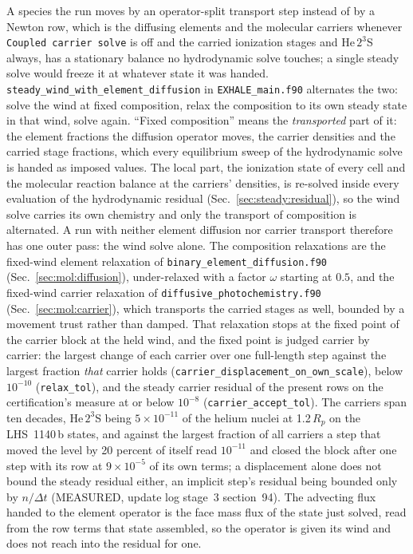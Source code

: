 A species the run moves by an operator-split transport step instead of by a
Newton row, which is the diffusing elements and the molecular carriers
whenever \texttt{Coupled carrier solve} is off and the carried ionization
stages and He\,$2^3$S always, has a stationary balance no
hydrodynamic solve touches; a single steady solve would freeze it at whatever
state it was handed.  \texttt{steady\_wind\_with\_element\_diffusion} in
\texttt{EXHALE\_main.f90} alternates the two: solve the wind at fixed
composition, relax the composition to its own steady state in that wind,
solve again. ``Fixed composition'' means the \emph{transported} part of it:
the element fractions the diffusion operator moves, the carrier densities and
the carried stage fractions, which every equilibrium sweep of the
hydrodynamic solve is handed as imposed values.
The local part, the ionization state of every cell and the molecular
reaction balance at the carriers' densities, is re-solved inside every
evaluation of the hydrodynamic residual (Sec.~\ref{sec:steady:residual}),
so the wind solve carries its own chemistry and only the transport of
composition is alternated. A run with neither element diffusion nor carrier
transport therefore has one outer pass: the wind solve alone.  The composition relaxations are the fixed-wind element
relaxation of \texttt{binary\_element\_diffusion.f90}
(Sec.~\ref{sec:mol:diffusion}), under-relaxed with a factor $\omega$ starting
at $0.5$, and the fixed-wind carrier relaxation of
\texttt{diffusive\_photochemistry.f90} (Sec.~\ref{sec:mol:carrier}), which
transports the carried stages as well, bounded by a movement trust rather than
damped.  That relaxation stops at the fixed point of the carrier block at the
held wind, and the fixed point is judged carrier by carrier: the largest
change of each carrier over one full-length step against the largest
fraction \emph{that} carrier holds (\texttt{carrier\_displacement\_on\_own\_scale}),
below $10^{-10}$ (\texttt{relax\_tol}), and the steady carrier residual of the present rows on the certification's
measure at or below $10^{-8}$ (\texttt{carrier\_accept\_tol}).  The carriers
span ten decades, He\,$2^3$S being $5\times10^{-11}$ of the helium nuclei at
1.2\,$R_p$ on the LHS~1140\,b states, and against the largest fraction of all
carriers a step that moved the level by 20 percent of itself read
$10^{-11}$ and closed the block after one step with its row at
$9\times10^{-5}$ of its own terms; a displacement alone does not bound the
steady residual either, an implicit step's residual being bounded only by
$n/\Delta t$ (MEASURED, update log stage~3 section~94).  The advecting flux handed to the element operator is the face
mass flux of the state just solved, read from the row terms that state
assembled, so the operator is given its wind and does not reach into the
residual for one.

